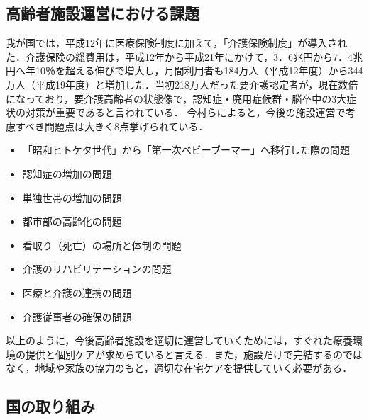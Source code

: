 \subsection{高齢者施設運営における課題}
我が国では，平成12年に医療保険制度に加えて，「介護保険制度」が導入された．介護保険の総費用は，平成12年から平成21年にかけて，3．6兆円から7．4兆円へ年10％を超える伸びで増大し，月間利用者も184万人（平成12年度）から344万人（平成19年度）と増加した．当初218万人だった要介護認定者が，現在数倍になっており，要介護高齢者の状態像で，認知症・廃用症候群・脳卒中の3大症状の対策が重要であると言われている．
今村ら\cite{nursing_management}によると，今後の施設運営で考慮すべき問題点は大きく8点挙げられている．

\begin{itemize}
 \item 「昭和ヒトケタ世代」から「第一次ベビーブーマー」へ移行した際の問題
 \item 認知症の増加の問題
 \item 単独世帯の増加の問題
 \item 都市部の高齢化の問題
 \item 看取り（死亡）の場所と体制の問題
 \item 介護のリハビリテーションの問題
 \item 医療と介護の連携の問題
 \item 介護従事者の確保の問題
\end{itemize}

以上のように，今後高齢者施設を適切に運営していくためには，すぐれた療養環境の提供と個別ケアが求めらていると言える．また，施設だけで完結するのではなく，地域や家族の協力のもと，適切な在宅ケアを提供していく必要がある．

\subsection{国の取り組み}

